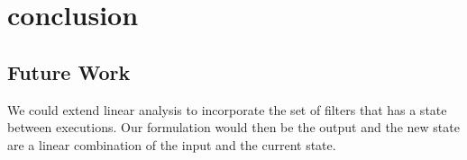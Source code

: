 \section{conclusion}


\subsection{Future Work}
We could extend linear analysis to incorporate the set of filters
that has a state between executions. Our formulation would then be
the output and the new state are a linear combination of the input 
and the current state.
